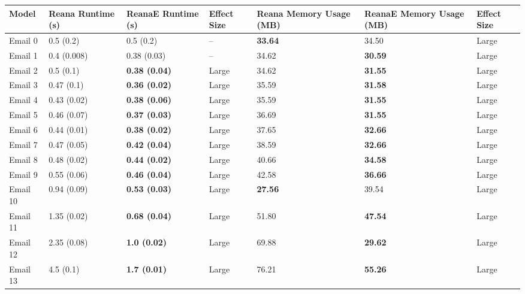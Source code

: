 \begin{tabular}{lllllll}
\toprule
    Model & Reana Runtime (s) &     ReanaE Runtime (s) & Effect Size & Reana Memory Usage (MB) & ReanaE Memory Usage (MB) & Effect Size \\
\midrule
  Email 0 &         0.5 (0.2) &              0.5 (0.2) &          -- &          \textbf{33.64} &                    34.50 &       Large \\
  Email 1 &       0.4 (0.008) &            0.38 (0.03) &          -- &                   34.62 &           \textbf{30.59} &       Large \\
  Email 2 &         0.5 (0.1) &   \textbf{0.38 (0.04)} &       Large &                   34.62 &           \textbf{31.55} &       Large \\
  Email 3 &        0.47 (0.1) &   \textbf{0.36 (0.02)} &       Large &                   35.59 &           \textbf{31.58} &       Large \\
  Email 4 &       0.43 (0.02) &   \textbf{0.38 (0.06)} &       Large &                   35.59 &           \textbf{31.55} &       Large \\
  Email 5 &       0.46 (0.07) &   \textbf{0.37 (0.03)} &       Large &                   36.69 &           \textbf{31.55} &       Large \\
  Email 6 &       0.44 (0.01) &   \textbf{0.38 (0.02)} &       Large &                   37.65 &           \textbf{32.66} &       Large \\
  Email 7 &       0.47 (0.05) &   \textbf{0.42 (0.04)} &       Large &                   38.59 &           \textbf{32.66} &       Large \\
  Email 8 &       0.48 (0.02) &   \textbf{0.44 (0.02)} &       Large &                   40.66 &           \textbf{34.58} &       Large \\
  Email 9 &       0.55 (0.06) &   \textbf{0.46 (0.04)} &       Large &                   42.58 &           \textbf{36.66} &       Large \\
 Email 10 &       0.94 (0.09) &   \textbf{0.53 (0.03)} &       Large &          \textbf{27.56} &                    39.54 &       Large \\
 Email 11 &       1.35 (0.02) &   \textbf{0.68 (0.04)} &       Large &                   51.80 &           \textbf{47.54} &       Large \\
 Email 12 &       2.35 (0.08) &    \textbf{1.0 (0.02)} &       Large &                   69.88 &           \textbf{29.62} &       Large \\
 Email 13 &         4.5 (0.1) &    \textbf{1.7 (0.01)} &       Large &                   76.21 &           \textbf{55.26} &       Large \\

\end{tabular}
